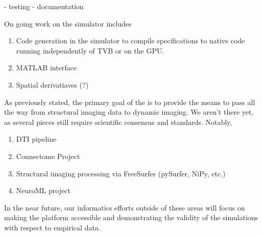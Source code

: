 
- testing
- documentation


On going work on the simulator includes

\begin{enumerate}
	\item Code generation in the simulator to compile specifications to native
		code running independently of TVB or on the GPU.
	\item MATLAB interface
	\item Spatial derivatiaves (?) 
\end{enumerate}

As previously stated, the primary goal of the \TVB is to provide the means
to pass all the way from structural imaging data to dynamic imaging. We
aren't there yet, as several pieces still require scientific consensus 
and standards. Notably, 

\begin{enumerate}
	\item DTI pipeline
	\item Connectome Project
	\item Structural imaging processing via FreeSurfer (pySurfer, NiPy, etc.)
	\item NeuroML project	
\end{enumerate}


In the near future, our informatics efforts outside of these areas will
focus on making the platform accessible and demonstrating the validity
of the simulations with respect to empirical data.

